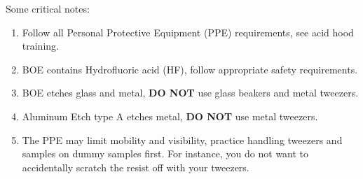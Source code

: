 Some critical notes: 
\begin{enumerate}
    \item Follow all Personal Protective Equipment (PPE) requirements, see acid hood training.
    \item BOE contains Hydrofluoric acid (HF), follow appropriate safety requirements.
    \item BOE etches glass and metal, \textbf{DO NOT} use glass beakers and metal tweezers.
    \item Aluminum Etch type A etches metal, \textbf{DO NOT} use metal tweezers.
    \item The PPE may limit mobility and visibility, practice handling tweezers and samples on dummy samples first. For instance, you do not want to accidentally scratch the resist off with your tweezers. 
\end{enumerate}

